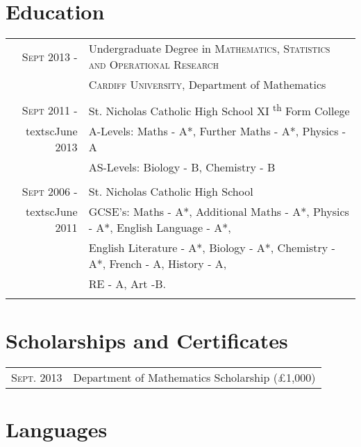 \documentclass[a4paper,10pt]{article} %
\begin{document}
{\section{Education}
\begin{tabular}{rl}

\textsc{Sept} 2013 - & Undergraduate Degree in \textsc{Mathematics, Statistics and Operational Research} \\
&\normalsize \textsc{Cardiff University}, Department of Mathematics\\
\\
\textsc{Sept} 2011 - & St. Nicholas Catholic High School XI \textsuperscript{th} Form College\\
textsc{June} 2013 & A-Levels: Maths - A*, Further Maths - A*, Physics - A\\
& AS-Levels: Biology - B, Chemistry - B\\
\\
\textsc{Sept} 2006 - & St. Nicholas Catholic High School\\
textsc{June} 2011 & GCSE's: Maths - A*, Additional Maths - A*, Physics - A*, English Language - A*,\\
& English Literature - A*, Biology - A*, Chemistry - A*, French - A, History - A,\\
& RE - A, Art -B.\\
\\

\end{tabular}
\section{Scholarships and Certificates}
\begin{tabular}{rl}

\textsc{Sept.} 2013 & Department of Mathematics Scholarship (\pounds1,000)\\

\end{tabular}
\section{Languages}
\begin{tabular}{rl}


\end{tabular}}
\end{document}
